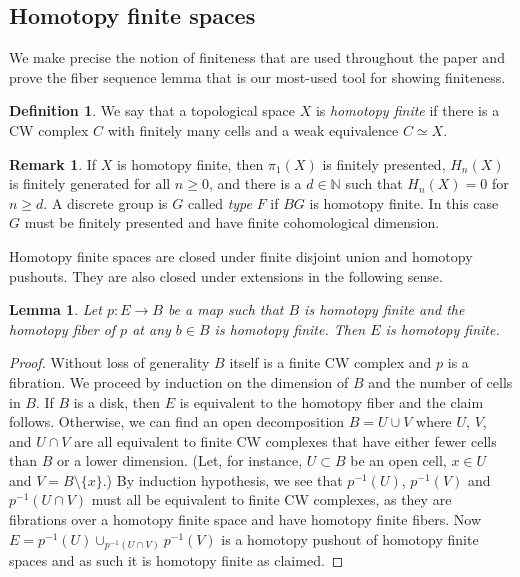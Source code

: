 \documentclass{amsart}
\theoremstyle{plain}
\newtheorem{lem}[thm]{Lemma}
\theoremstyle{definition}
\newtheorem{defn}[thm]{Definition}
\newtheorem{rem}[thm]{Remark}
\begin{document}
\subsection{Homotopy finite spaces}\label{section: homotopy-finite-spaces}
We make precise the notion of finiteness that are used throughout the paper and prove the fiber sequence lemma that is our most-used tool for showing finiteness.


\begin{defn}
    We say that a topological space $X$ is \emph{homotopy finite} if there is a CW complex $C$ with finitely many cells and a weak equivalence $C \simeq X$.
\end{defn}

\begin{rem}
    If $X$ is homotopy finite, then $\pi_1(X)$ is finitely presented, $H_n(X)$ is finitely generated for all $n\ge 0$, and there is a $d \in \mathbb{N}$ such that $H_n(X) = 0$ for $n \ge d$.
    A discrete group is $G$ called \emph{type} $F$  if $BG$ is homotopy finite.
    In this case $G$ must be finitely presented and have finite cohomological dimension.
\end{rem}

Homotopy finite spaces are closed under finite disjoint union and  homotopy pushouts.
They are also closed under extensions in the following sense.

\begin{lem}\label{lem:fiber-sequence-finite}
    Let $p\colon E \to B$ be a map such that $B$ is homotopy finite and the homotopy fiber of $p$ at any $b \in B$ is homotopy finite.
    Then $E$ is homotopy finite.
\end{lem}
\begin{proof}
    Without loss of generality $B$ itself is a finite CW complex and $p$ is a fibration.
    We proceed by induction on the dimension of $B$ and the number of cells in $B$.
    If $B$ is a disk, then $E$ is equivalent to the homotopy fiber and the claim follows.
    Otherwise, we can find an open decomposition $B = U \cup V$ where $U$, $V$, and $U \cap V$ are all equivalent to finite CW complexes that have either fewer cells than $B$ or a lower dimension.
    (Let, for instance, $U \subset B$ be an open cell, $x \in U$ and $V = B \setminus \{x\}$.)
    By induction hypothesis, we see that $p^{-1}(U)$, $p^{-1}(V)$ and $p^{-1}(U \cap V)$ must all be equivalent to finite CW complexes, as they are fibrations over a homotopy finite space and have homotopy finite fibers.
    Now $E = p^{-1}(U) \cup_{p^{-1}(U \cap V)} p^{-1}(V)$ is a homotopy pushout of homotopy finite spaces and as such it is homotopy finite as claimed.
\end{proof}
\end{document}
